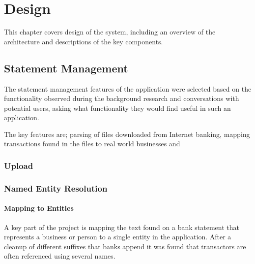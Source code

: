 \chapter{Design}

\begin{comment}
Chapter 3: Design
This chapter starts to describe the student's own work. It is where the main design aspects of the project are described. The style of presentation may reflect the life cycle of the project, for example commencing with the Requirements Analysis, but it should not read like a diary. The design should be clearly and precisely described with supporting diagrams. The presentation should be at a fairly high level without excessive detail. This chapter is a suitable place to justify your choice of architecture, implementation technologies and APIs used.
\end{comment}


This chapter covers design of the system, including an overview of the architecture and descriptions of the key components. 

\section{Statement Management}
The statement management features of the application were selected based on the functionality observed during the background research and conversations with potential users, asking what functionality they would find useful in such an application.

The key features are; parsing of files downloaded from Internet banking, mapping transactions found in the files to real world businesses and 

\subsection{Upload}

\subsection{Named Entity Resolution}


\subsubsection{Mapping to Entities}
A key part of the project is mapping the text found on a bank statement that represents a business or person to a single entity in the application. After a cleanup of different suffixes that banks append it was found that transactors are often referenced using several names.

